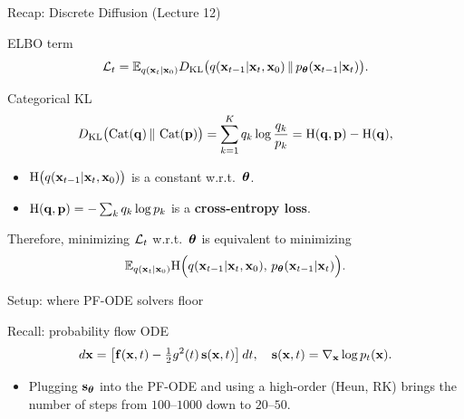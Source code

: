 \documentclass{beamer}
\begin{document}
\begin{frame}{Recap: Discrete Diffusion (Lecture 12)}

	\begin{block}{ELBO term}
		\vspace{-0.3cm}
		\[
			\mathcal{L}_t
			= \mathbb{E}_{q(\mathbf{x}_t | \mathbf{x}_0)}
			D_\mathrm{KL}\bigl(q(\mathbf{x}_{t-1} | \mathbf{x}_t, \mathbf{x}_0) \,\|\, p_{\boldsymbol{\theta}}(\mathbf{x}_{t-1} | \mathbf{x}_t)\bigr).
		\]
		\vspace{-0.3cm}
	\end{block}
	\begin{block}{Categorical KL}
		\vspace{-0.3cm}
		\[
			D_\mathrm{KL}\bigl(\operatorname{Cat}(\mathbf{q}) \,\|\, \operatorname{Cat}(\mathbf{p})\bigr)
			= \sum_{k=1}^K q_k \log \frac{q_k}{p_k}
			= \mathrm{H}(\mathbf{q},\mathbf{p}) - \mathrm{H}(\mathbf{q}),
		\]
		\begin{itemize}
			\item $\mathrm{H}\bigl(q(\mathbf{x}_{t-1} | \mathbf{x}_t, \mathbf{x}_0)\bigr)$ is a constant w.r.t.~$\boldsymbol{\theta}$.
			\item $\mathrm{H}(\mathbf{q},\mathbf{p}) = -\sum_k q_k \log p_k$ is a \textbf{cross-entropy loss}.
		\end{itemize}
	\end{block}
	Therefore, minimizing $\mathcal{L}_t$ w.r.t.~$\boldsymbol{\theta}$ is equivalent to minimizing
	\[
		\mathbb{E}_{q(\mathbf{x}_t | \mathbf{x}_0)}
		\mathrm{H}\Bigl(q(\mathbf{x}_{t-1} | \mathbf{x}_t, \mathbf{x}_0),\, p_{\boldsymbol{\theta}}(\mathbf{x}_{t-1} | \mathbf{x}_t)\Bigr).
	\]
\end{frame}
\begin{frame}{Setup: where PF-ODE solvers floor}
	\begin{block}{Recall: probability flow ODE}
		\vspace{-0.3cm}
		\[
			d\mathbf{x} = \left[\mathbf{f}(\mathbf{x}, t) - \tfrac{1}{2} g^2(t)\, \mathbf{s}(\mathbf{x}, t)\right] dt, \quad \mathbf{s}(\mathbf{x}, t) = \nabla_{\mathbf{x}} \log p_t(\mathbf{x}).
		\]
	\end{block}
	\eqpause
	\begin{itemize}
		\item Plugging $\mathbf{s}_{\boldsymbol{\theta}}$ into the PF-ODE and using a high-order \ODESolve (Heun, RK) brings the number of steps from $100$--$1000$ down to $20$--$50$.
	\end{itemize}
\end{frame}
\end{document}
